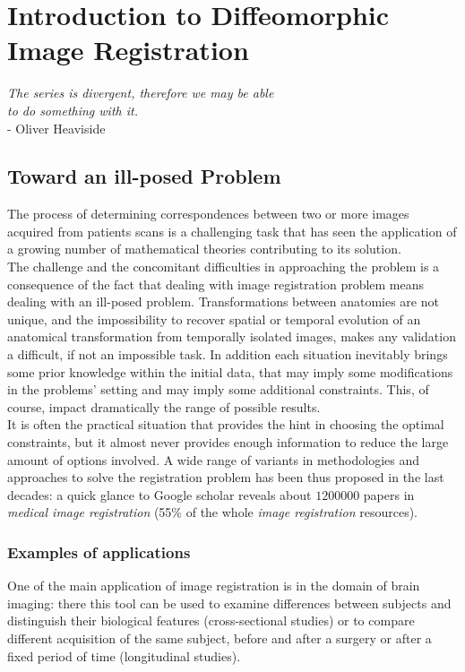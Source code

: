 \chapter{Introduction to Diffeomorphic Image Registration}\label{ch:introduction}


\begin{flushright}
		\emph{The series is divergent, therefore we may be able \\ to do something with it.}\\
			- Oliver Heaviside
\end{flushright}

\vspace{0.6cm}


\section{Toward an ill-posed Problem}
The process of determining correspondences between two or more images acquired from patients scans is a challenging task that has seen the application of a growing number of mathematical theories contributing to its solution.\\

The challenge and the concomitant difficulties in approaching the problem is a consequence of the fact that dealing with image registration problem means dealing with an ill-posed problem. Transformations between anatomies are not unique, and the impossibility to recover spatial or temporal evolution of an anatomical transformation from temporally isolated images, makes any validation a difficult, if not an impossible task. 
In addition each situation inevitably brings some prior knowledge within the initial data, that may imply some modifications in the problems' setting and may imply some additional constraints. This, of course, impact dramatically the range of possible results. \\

It is often the practical situation that provides the hint in choosing the optimal constraints, but it almost never provides enough information to reduce the large amount of options involved. A wide range of variants in methodologies and approaches to solve the registration problem has been thus proposed in the last decades: a quick glance to Google scholar reveals about $1200000$ papers in \emph{medical image registration} (55\% of the whole \emph{image registration} resources). 

\subsection{Examples of applications}
One of the main application of image registration is in the domain of brain imaging: there this tool can be used to examine differences between subjects and distinguish their biological features (cross-sectional studies) or to compare different acquisition of the same subject, before and after a surgery or after a fixed period of time (longitudinal studies). \\

